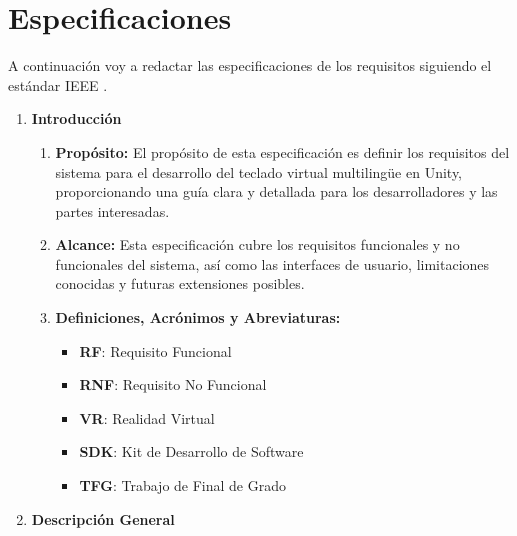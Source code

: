 \section{Especificaciones}


A continuación voy a redactar las especificaciones de los requisitos siguiendo el estándar IEEE \cite{ieee830-1993}.

\begin{enumerate}
	
	\item \textbf{Introducción}
	
	\begin{enumerate}
		
		\item \textbf{Propósito:} El propósito de esta especificación es definir los requisitos del sistema para el desarrollo del teclado virtual multilingüe en Unity, proporcionando una guía clara y detallada para los desarrolladores y las partes interesadas.
		
		\item \textbf{Alcance:} Esta especificación cubre los requisitos funcionales y no funcionales del sistema, así como las interfaces de usuario, limitaciones conocidas y futuras extensiones posibles.
		
		\item \textbf{Definiciones, Acrónimos y Abreviaturas:}
		
		\begin{itemize}
			
			\item \textbf{RF}: Requisito Funcional
			
			\item \textbf{RNF}: Requisito No Funcional
			
			\item \textbf{VR}: Realidad Virtual
			
			\item \textbf{SDK}: Kit de Desarrollo de Software
			
			\item \textbf{TFG}: Trabajo de Final de Grado
			
		\end{itemize}
		
	\end{enumerate}
	
	\item \textbf{Descripción General}
	

\end{enumerate}
